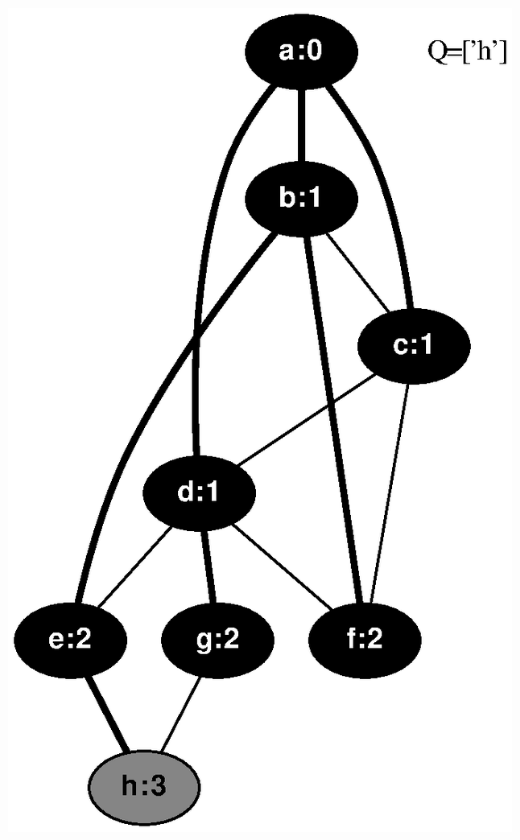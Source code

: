 \documentclass{article}
\begin{document}
\includegraphics[height=.3\textheight]{bfs_undirected_classroom_key_07.eps}
\vspace{1em}
\end{document}
